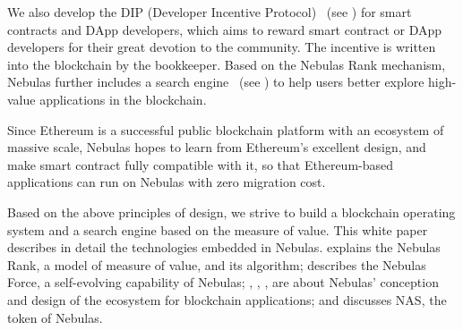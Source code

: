 \begin{itemize}
We also develop the DIP (Developer Incentive Protocol) ~(see ) for smart contracts and DApp developers, which aims to reward smart contract or DApp developers for their great devotion to the community. The incentive is written into the blockchain by the bookkeeper. Based on the Nebulas Rank mechanism, Nebulas further includes a search engine ~(see ) to help users better explore high-value applications in the blockchain.
\end{itemize}

Since Ethereum is a successful public blockchain platform with an ecosystem of massive scale, Nebulas hopes to learn from Ethereum's excellent design, and make smart contract fully compatible with it, so that Ethereum-based applications can run on Nebulas with zero migration cost.


Based on the above principles of design, we strive to build a blockchain operating system and a search engine based on the measure of value. This white paper describes in detail the technologies embedded in Nebulas.  explains the Nebulas Rank, a model of measure of value, and its algorithm;  describes the Nebulas Force, a self-evolving capability of Nebulas; , , ,  are about Nebulas’ conception and design of the ecosystem for blockchain applications; and  discusses NAS, the token of Nebulas.
